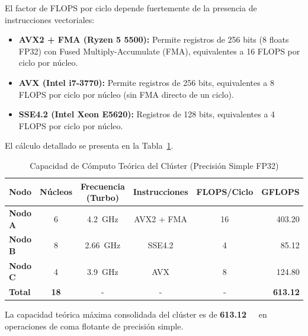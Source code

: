 \documentclass[11pt,a4paper]{article}
\begin{document}
El factor de FLOPS por ciclo depende fuertemente de la presencia de instrucciones vectoriales:
\begin{itemize}
    \item \textbf{AVX2 + FMA (Ryzen 5 5500):} Permite registros de 256 bits (8 floats FP32) con Fused Multiply-Accumulate (FMA), equivalentes a 16 FLOPS por ciclo por núcleo.
    \item \textbf{AVX (Intel i7-3770):} Permite registros de 256 bits, equivalentes a 8 FLOPS por ciclo por núcleo (sin FMA directo de un ciclo).
    \item \textbf{SSE4.2 (Intel Xeon E5620):} Registros de 128 bits, equivalentes a 4 FLOPS por ciclo por núcleo.
\end{itemize}

El cálculo detallado se presenta en la Tabla~\ref{tab:flops}.

\begin{table}[h!]
\centering
\caption{Capacidad de Cómputo Teórica del Clúster (Precisión Simple FP32)}
\label{tab:flops}
\vspace{0.2cm}
\begin{tabular}{lccccr}
\toprule
\textbf{Nodo} & \textbf{Núcleos} & \textbf{Frecuencia (Turbo)} & \textbf{Instrucciones} & \textbf{FLOPS/Ciclo} & \textbf{GFLOPS} \\ \midrule
\textbf{Nodo A} & 6 & \SI{4.2}{\giga\hertz} & AVX2 + FMA & 16 & 403.20 \\
\textbf{Nodo B} & 8 & \SI{2.66}{\giga\hertz} & SSE4.2 & 4 & 85.12 \\
\textbf{Nodo C} & 4 & \SI{3.9}{\giga\hertz} & AVX & 8 & 124.80 \\ \midrule
\textbf{Total} & \textbf{18} & - & - & - & \textbf{613.12} \\
\bottomrule
\end{tabular}
\end{table}

La capacidad teórica máxima consolidada del clúster es de \textbf{\SI{613.12}{\giga\flops}} en operaciones de coma flotante de precisión simple.
\end{document}

